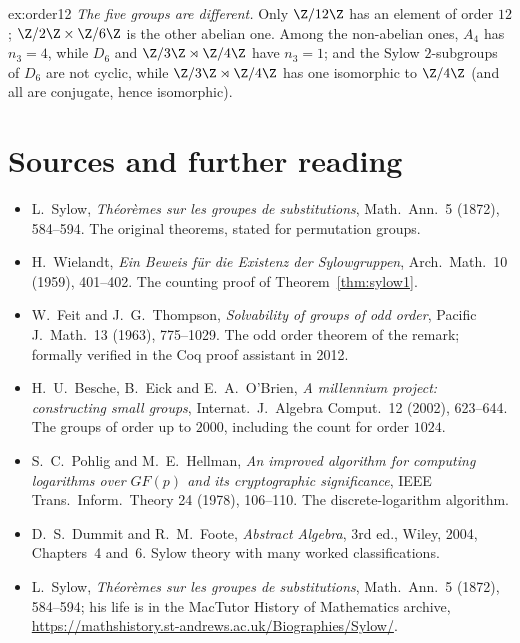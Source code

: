 \begin{solution}{ex:order12}
\emph{The five groups are different.} Only $\Z/12\Z$ has an element of order $12$; $\Z/2\Z\times\Z/6\Z$ is the other abelian one. Among the non-abelian ones, $A_4$ has $n_3=4$, while $D_6$ and $\Z/3\Z\rtimes\Z/4\Z$ have $n_3=1$; and the Sylow $2$-subgroups of $D_6$ are not cyclic, while $\Z/3\Z\rtimes\Z/4\Z$ has one isomorphic to $\Z/4\Z$ (and all are conjugate, hence isomorphic).
\end{solution}

\section*{Sources and further reading}

\begin{itemize}
\item L.~Sylow, \emph{Th\'eor\`emes sur les groupes de substitutions}, Math.\ Ann.\ 5 (1872), 584--594. The original theorems, stated for permutation groups.
\item H.~Wielandt, \emph{Ein Beweis f\"ur die Existenz der Sylowgruppen}, Arch.\ Math.\ 10 (1959), 401--402. The counting proof of Theorem~\ref{thm:sylow1}.
\item W.~Feit and J.~G.~Thompson, \emph{Solvability of groups of odd order}, Pacific J.\ Math.\ 13 (1963), 775--1029. The odd order theorem of the remark; formally verified in the Coq proof assistant in 2012.
\item H.~U.~Besche, B.~Eick and E.~A.~O'Brien, \emph{A millennium project: constructing small groups}, Internat.\ J.\ Algebra Comput.\ 12 (2002), 623--644. The groups of order up to $2000$, including the count for order $1024$.
\item S.~C.~Pohlig and M.~E.~Hellman, \emph{An improved algorithm for computing logarithms over $GF(p)$ and its cryptographic significance}, IEEE Trans.\ Inform.\ Theory 24 (1978), 106--110. The discrete-logarithm algorithm.
\item D.~S.~Dummit and R.~M.~Foote, \emph{Abstract Algebra}, 3rd ed., Wiley, 2004, Chapters~4 and~6. Sylow theory with many worked classifications.
\item L.~Sylow, \emph{Th\'eor\`emes sur les groupes de substitutions}, Math.\ Ann.\ 5 (1872), 584--594; his life is in the MacTutor History of Mathematics archive, \url{https://mathshistory.st-andrews.ac.uk/Biographies/Sylow/}.
\end{itemize}
